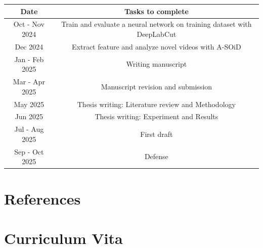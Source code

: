 \documentclass{article}
\begin{document}
\begin{center}
\begin{tabular}{ |c|c| } 
 \hline
 Date & Tasks to complete \\
 \hline
 Oct - Nov 2024 & Train and evaluate a neural network on training dataset with DeepLabCut\\
 Dec 2024 & Extract feature and analyze novel videos with A-SOiD\\
 Jan - Feb 2025 & Writing manuscript\\
 Mar - Apr 2025 & Manuscript revision and submission\\
 May 2025 & Thesis writing: Literature review and Methodology\\
 Jun 2025 & Thesis writing: Experiment and Results\\
 Jul - Aug 2025 & First draft\\
 Sep - Oct 2025 & Defense\\
 \hline
\end{tabular}
\end{center}

\clearpage


\section{References}



\clearpage

\section{Curriculum Vita}
\end{document}
